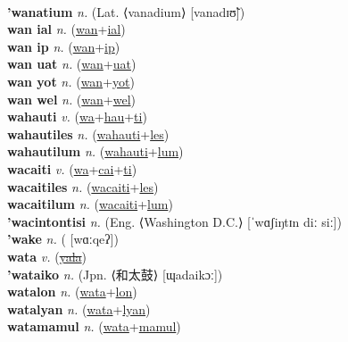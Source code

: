  \label{wan ayf} \\
\textbf{'wanatium} \textit{n.} (Lat. ⟨vanadium⟩ [vanadɪʊ̃])
 \label{'wanatium} \\
\textbf{wan ial} \textit{n.} (\hyperref[wan]{wan}+\hyperref[ial]{ial})
 \label{wan ial} \\
\textbf{wan ip} \textit{n.} (\hyperref[wan]{wan}+\hyperref[ip]{ip})
 \label{wan ip} \\
\textbf{wan uat} \textit{n.} (\hyperref[wan]{wan}+\hyperref[uat]{uat})
 \label{wan uat} \\
\textbf{wan yot} \textit{n.} (\hyperref[wan]{wan}+\hyperref[yot]{yot})
 \label{wan yot} \\
\textbf{wan wel} \textit{n.} (\hyperref[wan]{wan}+\hyperref[wel]{wel})
 \label{wan wel} \\
\textbf{wahauti} \textit{v.} (\hyperref[wa]{wa}+\hyperref[hau]{hau}+\hyperref[ti]{ti})
 \label{wahauti} \\
\textbf{wahautiles} \textit{n.} (\hyperref[wahauti]{wahauti}+\hyperref[les]{les})
 \label{wahautiles} \\
\textbf{wahautilum} \textit{n.} (\hyperref[wahauti]{wahauti}+\hyperref[lum]{lum})
 \label{wahautilum} \\
\textbf{wacaiti} \textit{v.} (\hyperref[wa]{wa}+\hyperref[cai]{cai}+\hyperref[ti]{ti})
 \label{wacaiti} \\
\textbf{wacaitiles} \textit{n.} (\hyperref[wacaiti]{wacaiti}+\hyperref[les]{les})
 \label{wacaitiles} \\
\textbf{wacaitilum} \textit{n.} (\hyperref[wacaiti]{wacaiti}+\hyperref[lum]{lum})
 \label{wacaitilum} \\
\textbf{'wacintontisi} \textit{n.} (Eng. ⟨Washington D.C.⟩ [ˈwɑʃiŋtɪn diː siː])
 \label{'wacintontisi} \\
\textbf{'wake} \textit{n.} ( [wɑːqeʔ])
 \label{'wake} \\
\textbf{wata} \textit{v.} (\hyperref[yala]{\sout{yala}})
 \label{wata} \\
\textbf{'wataiko} \textit{n.} (Jpn. ⟨和太鼓⟩ [ɰadaikɔː])
 \label{'wataiko} \\
\textbf{watalon} \textit{n.} (\hyperref[wata]{wata}+\hyperref[lon]{lon})
 \label{watalon} \\
\textbf{watalyan} \textit{n.} (\hyperref[wata]{wata}+\hyperref[lyan]{lyan})
 \label{watalyan} \\
\textbf{watamamul} \textit{n.} (\hyperref[wata]{wata}+\hyperref[mamul]{mamul})
 \label{watamamul} \\
